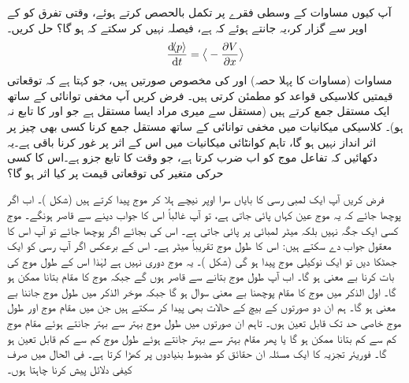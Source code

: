 آپ کیوں مساوات  کے وسطی فقرے  پر تکمل بالحصص کرتے ہوئے، وقتی تفرق کو  کے اوپر سے گزار کر،یہ جانتے ہوئے کہ  ہے، فیصلہ نہیں کر سکتے  کہ  ہو گا؟
  حل  کریں۔
\begin{align}\label{مساوات_تفاعل_موج_مخفی_توانائی_سے_معیار_حرکت}
\frac{\dif\langle p \rangle}{\dif t}=\big\langle-\frac{\partial V}{\partial x} \big\rangle
\end{align}
مساوات  (مساوات  کا پہلا حصہ) اور  
 کی مخصوص صورتیں ہیں، جو کہتا ہے کہ توقعاتی قیمتیں کلاسیکی قواعد کو مطمئن کرتی  ہیں۔
فرض کریں آپ مخفی توانائی کے ساتھ ایک مستقل جمع کرتے ہیں (مستقل سے میری  مراد ایسا مستقل ہے  جو  اور  کا تابع نہ ہو)۔ کلاسیکی میکانیات میں  مخفی توانائی کے ساتھ مستقل جمع کرنا  کسی بھی چیز پر اثر انداز نہیں ہو گا،  تاہم  کوانٹائی میکانیات میں اس کے اثر پر غور کرنا باقی ہے۔یہ  دکھائیں کہ تفاعل موج کو اب  ضرب کرتا ہے،  جو وقت کا تابع جزو ہے۔اس کا کسی حرکی متغیر کی توقعاتی قیمت پر کیا اثر ہو گا؟ 

فرض کریں آپ ایک لمبی رسی کا  بایاں  سرا  اوپر نیچے  ہلا کر موج پیدا کرتے ہیں (شکل )۔ اب اگر پوچھا جائے کہ یہ موج عین   کہاں پائی جاتی ہے،  تو آپ غالباً اس کا جواب دینے سے قاصر ہونگے۔ موج کسی ایک جگہ نہیں بلکہ    میٹر لمبائی پر پائی جاتی ہے۔ اس کی بجائے اگر   پوچھا جائے  تو آپ اس کا معقول جواب دے سکتے ہیں:  اس کا طول موج تقریباً      میٹر ہے۔ اس کے برعکس اگر آپ رسی کو ایک جھٹکا دیں تو  ایک نوکیلی موج پیدا ہو گی
 (شکل )۔ یہ موج دوری نہیں ہے لہٰذا اس کے طول موج کی بات کرنا بے معنی ہو گا۔ اب آپ طول موج بتانے سے قاصر ہوں گے جبکہ  موج کا مقام بتانا ممکن ہو گا۔ اول الذکر  میں موج کا مقام پوچھنا بے معنی سوال ہو گا جبکہ موخر الذکر میں طول موج جاننا بے معنی  ہو گا۔ ہم ان دو صورتوں کے بیچ کے حالات بھی پیدا کر سکتے ہیں  جن میں  مقام موج   اور  طول موج خاصی حد تک قابل تعین ہوں۔ تاہم ان صورتوں میں طول موج بہتر سے بہتر جانتے ہوئے مقام موج کم سے کم بتانا ممکن ہو گا یا پھر مقام بہتر سے بہتر جانتے ہوئے طول موج کم سے کم قابل تعین   ہو گا۔ فوریئر تجزیہ کا ایک مسئلہ ان حقائق کو مضبوط بنیادوں پر کھڑا کرتا ہے۔ فی الحال میں صرف کیفی دلائل پیش کرنا چاہتا ہوں۔

